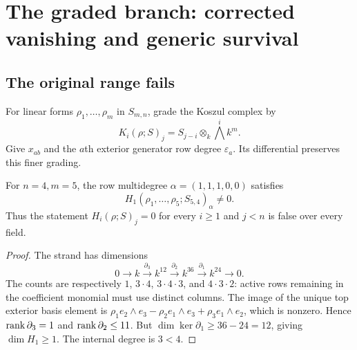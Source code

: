\chapter{The graded branch: corrected vanishing and generic survival}\label{ch:graded}

\section{The original range fails}
For linear forms $\rho_1,\ldots,\rho_m$ in $S_{m,n}$, grade the Koszul complex by
\[
 K_i(\rho;S)_j=S_{j-i}\otimes_k\bigwedge^i k^m.
\]
Give $x_{ab}$ and the $a$th exterior generator row degree $\varepsilon_a$. Its differential preserves this finer grading.

\begin{lemma}\label{lem:koszul-counter}
For $n=4,m=5$, the row multidegree $\alpha=(1,1,1,0,0)$ satisfies
\[
 H_1(\rho_1,\ldots,\rho_5;S_{5,4})_\alpha\ne0.
\]
Thus the statement $H_i(\rho;S)_j=0$ for every $i\ge1$ and $j<n$ is false over every field.
\end{lemma}
\begin{proof}
The strand has dimensions
\[
 0\longrightarrow k\xrightarrow{\partial_3}k^{12}
 \xrightarrow{\partial_2}k^{36}
 \xrightarrow{\partial_1}k^{24}\longrightarrow0.
\]
The counts are respectively $1$, $3\cdot4$, $3\cdot4\cdot3$, and $4\cdot3\cdot2$: active rows remaining in the coefficient monomial must use distinct columns. The image of the unique top exterior basis element is
$\rho_1e_2\wedge e_3-\rho_2e_1\wedge e_3+\rho_3e_1\wedge e_2$, which is nonzero. Hence $\operatorname{rank}\partial_3=1$ and $\operatorname{rank}\partial_2\le11$. But $\dim\ker\partial_1\ge36-24=12$, giving $\dim H_1\ge1$. The internal degree is $3<4$.
\end{proof}

